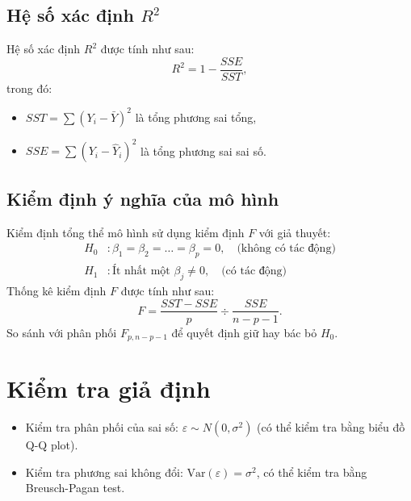 \subsection{Hệ số xác định $R^2$}
Hệ số xác định $R^2$ được tính như sau:
\begin{equation}
    R^2 = 1 - \frac{SSE}{SST},
\end{equation}
trong đó:
\begin{itemize}
    \item $SST = \sum (Y_i - \bar{Y})^2$ là tổng phương sai tổng,
    \item $SSE = \sum (Y_i - \hat{Y}_i)^2$ là tổng phương sai sai số.
\end{itemize}

\subsection{Kiểm định ý nghĩa của mô hình}
Kiểm định tổng thể mô hình sử dụng kiểm định $F$ với giả thuyết:
\begin{align*}
    H_0 &: \beta_1 = \beta_2 = \dots = \beta_p = 0, \quad \text{(không có tác động)} \\
    H_1 &: \text{Ít nhất một } \beta_j \neq 0, \quad \text{(có tác động)}
\end{align*}
Thống kê kiểm định $F$ được tính như sau:
\begin{equation}
    F = \frac{SST - SSE}{p} \div \frac{SSE}{n - p - 1}.
\end{equation}
So sánh với phân phối $F_{p, n - p - 1}$ để quyết định giữ hay bác bỏ $H_0$.

\section{Kiểm tra giả định}
\begin{itemize}
    \item Kiểm tra phân phối của sai số: $\varepsilon \sim N(0, \sigma^2)$ (có thể kiểm tra bằng biểu đồ Q-Q plot).
    \item Kiểm tra phương sai không đổi: $\text{Var}(\varepsilon) = \sigma^2$, có thể kiểm tra bằng Breusch-Pagan test.
\end{itemize}
